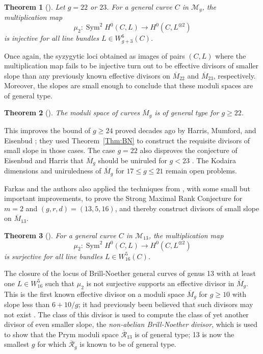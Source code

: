 \documentclass{amsart}
\newtheorem{theorem}{Theorem}[section]
\theoremstyle{definition}
\def\cM{\mathcal{M}}
\newcommand{\M}{\overline{M}}
\newcommand{\Sym}{\operatorname{Sym}}
\begin{document}
\begin{theorem} [\cite{M23}]
\label{Thm:SMRC23}
Let $g=22$ or $23$. For a general curve $C$ in $\cM_g$, the multiplication map
\[
\mu_2 \colon \Sym^2 H^0(C, L) \to H^0(C,L^{\otimes 2})
\]
is injective for \emph{all} line bundles $L\in W^6_{g+3}(C)$.
\end{theorem}

Once again, the syzygytic loci obtained as images of pairs $(C,L)$ where the multiplication map fails to be injective turn out to be effective divisors of smaller slope than any previously known effective divisors on $\M_{22}$ and $\M_{23}$, respectively. Moreover, the slopes are small enough to conclude that these moduli spaces are of general type.

\begin{theorem} [\cite{M23}]
\label{Thm:GeneralType}
The moduli space of curves $\M_g$ is of general type for $g \geq 22$.
\end{theorem}

\noindent This improves the bound of $g \geq 24$ proved decades ago by Harris, Mumford, and Eisenbud \cite{HarrisMumford82, Harris84, EisenbudHarris87b}; they used Theorem~\ref{Thm:BN} to construct the requisite divisors of small slope in those cases. The case $g = 22$ also disproves the conjecture of Eisenbud and Harris that $\M_g$ should be uniruled for $g < 23$ \cite{EisenbudHarris89b}.  The Kodaira dimensions and uniruledness of $\M_g$ for $17 \leq g \leq 21$ remain open problems. 

\medskip

Farkas and the authors also applied the techniques from \cite{M23}, with some small but important improvements, to prove the Strong Maximal Rank Conjecture for $m =2$ and $(g,r,d) = (13,5,16)$, and thereby construct divisors of small slope on $\M_{13}$.

\begin{theorem}[\cite{R13}]
For a general curve $C$ in $\cM_{13}$, the multiplication map
\[
\mu_2 \colon \Sym^2 H^0(C, L) \to H^0(C,L^{\otimes 2})
\]
is surjective for all line bundles $L \in W^5_{16}(C)$.
\end{theorem}

The closure of the locus of Brill-Noether general curves of genus 13 with at least one $L \in W^5_{16}$ such that $\mu_2$ is not surjective supports an effective divisor in $\M_g$.  This is the first known effective divisor on a moduli space $\M_g$ for $g \geq 10$ with slope less than $6 + 10/g$; it had previously been believed that such divisors may not exist \cite{ChenFarkasMorrison13}.  The class of this divisor is used to compute the class of yet another divisor of even smaller slope, the \emph{non-abelian Brill-Noether divisor}, which is used to show that the  Prym moduli space $\overline{\mathcal{R}}_{13}$ is of general type; 13 is now the smallest $g$ for which $\overline{\mathcal{R}}_g$ is known to be of general type.   
\end{document}
